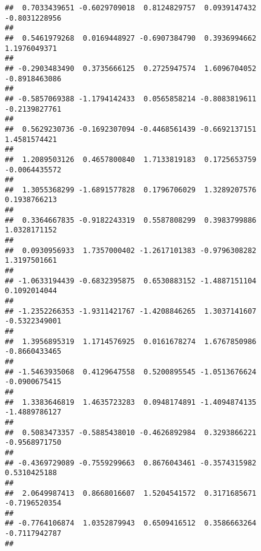 \documentclass[]{article}
\begin{document}
\begin{verbatim}
##  0.7033439651 -0.6029709018  0.8124829757  0.0939147432 -0.8031228956 
##                                                                       
##  0.5461979268  0.0169448927 -0.6907384790  0.3936994662  1.1976049371 
##                                                                       
## -0.2903483490  0.3735666125  0.2725947574  1.6096704052 -0.8918463086 
##                                                                       
## -0.5857069388 -1.1794142433  0.0565858214 -0.8083819611 -0.2139827761 
##                                                                       
##  0.5629230736 -0.1692307094 -0.4468561439 -0.6692137151  1.4581574421 
##                                                                       
##  1.2089503126  0.4657800840  1.7133819183  0.1725653759 -0.0064435572 
##                                                                       
##  1.3055368299 -1.6891577828  0.1796706029  1.3289207576  0.1938766213 
##                                                                       
##  0.3364667835 -0.9182243319  0.5587808299  0.3983799886  1.0328171152 
##                                                                       
##  0.0930956933  1.7357000402 -1.2617101383 -0.9796308282  1.3197501661 
##                                                                       
## -1.0633194439 -0.6832395875  0.6530883152 -1.4887151104  0.1092014044 
##                                                                       
## -1.2352266353 -1.9311421767 -1.4208846265  1.3037141607 -0.5322349001 
##                                                                       
##  1.3956895319  1.1714576925  0.0161678274  1.6767850986 -0.8660433465 
##                                                                       
## -1.5463935068  0.4129647558  0.5200895545 -1.0513676624 -0.0900675415 
##                                                                       
##  1.3383646819  1.4635723283  0.0948174891 -1.4094874135 -1.4889786127 
##                                                                       
##  0.5083473357 -0.5885438010 -0.4626892984  0.3293866221 -0.9568971750 
##                                                                       
## -0.4369729089 -0.7559299663  0.8676043461 -0.3574315982  0.5310425188 
##                                                                       
##  2.0649987413  0.8668016607  1.5204541572  0.3171685671 -0.7196520354 
##                                                                       
## -0.7764106874  1.0352879943  0.6509416512  0.3586663264 -0.7117942787 
##                                                                       

\end{verbatim}
\end{document}

